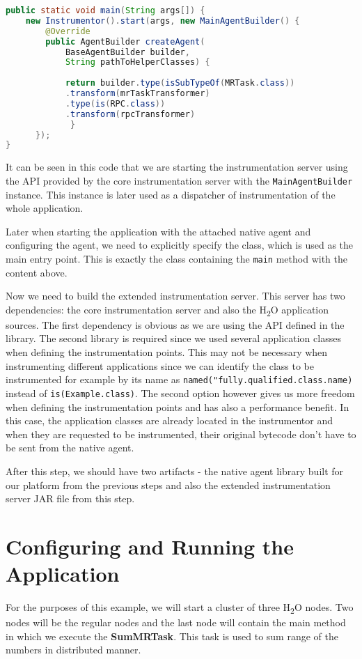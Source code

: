 \begin{lstlisting}[language=Java]
 public static void main(String args[]) {
	new Instrumentor().start(args, new MainAgentBuilder() {
		@Override
		public AgentBuilder createAgent(
			BaseAgentBuilder builder,
			String pathToHelperClasses) {
	 		 
			return builder.type(isSubTypeOf(MRTask.class))
			.transform(mrTaskTransformer)
			.type(is(RPC.class))
			.transform(rpcTransformer)
	         }
	  });
}			 
\end{lstlisting}
It can be seen in this code that we are starting the instrumentation server using the API provided by the core instrumentation server with the \texttt{MainAgentBuilder} instance. This instance is later used as a dispatcher of instrumentation of the whole application.

Later when starting the application with the attached native agent and configuring the agent, we need to explicitly specify the class, which is used as the main entry point. This is exactly the class containing the \texttt{main} method with the content above.

Now we need to build the extended instrumentation server. This server has two dependencies: the core instrumentation server and also the H\textsubscript{2}O application sources. The first dependency is obvious as we are using the API defined in the library. The second library is required since we used several application classes when defining the instrumentation points. This may not be necessary when instrumenting different applications since we can identify the class to be instrumented for example by its name as \texttt{named("fully.qualified.class.name)} instead of \texttt{is(Example.class)}. The second option however gives us more freedom when defining the instrumentation points and has also a performance benefit. In this case, the application classes are already located in the instrumentor and when they are requested to be instrumented, their original bytecode don't have to be sent from the native agent. 

After this step, we should have two artifacts - the native agent library built for our platform from the previous steps and also the extended instrumentation server JAR file from this step.
\section{Configuring and Running the Application}
For the purposes of this example, we will start a cluster of three H\textsubscript{2}O nodes. Two nodes will be the regular nodes and the last node will contain the main method in which we execute the \textbf{SumMRTask}. This task is used to sum range of the numbers in distributed manner.


